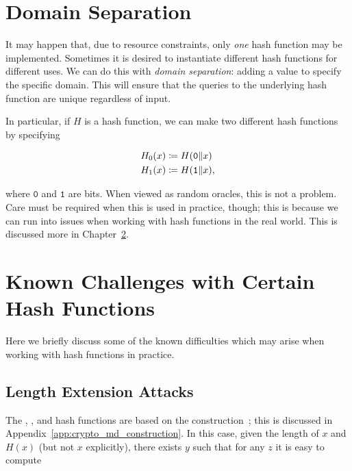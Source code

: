 \section{Domain Separation}

It may happen that, due to resource constraints, only \emph{one}
\gls{hash function} may be implemented.
Sometimes it is desired to instantiate different \glspl{hash function}
for different uses.
We can do this with \emph{domain separation}:
adding a value to specify the specific domain.
This will ensure that the queries to the underlying \gls{hash function}
are unique regardless of input.

In particular, if $H$ is a \gls{hash function}, we can make two different
\glspl{hash function} by specifying

\begin{align}
    H_{0}(x) &\coloneqq{} H(\texttt{0}\|x) \nonumber\\
    H_{1}(x) &\coloneqq{} H(\texttt{1}\|x),
\end{align}

\noindent
where $\texttt{0}$ and $\texttt{1}$ are bits.
When viewed as \glspl{random oracle}, this is not a problem.
Care must be required when this is used in practice, though;
this is because we can run into issues when working with
\glspl{hash function} in the real world.
This is discussed more in Chapter~\ref{sec:hash_challenges}.



\section{Known Challenges with Certain Hash Functions}
\label{sec:hash_challenges}

Here we briefly discuss some of the known difficulties which may arise when
working with \glspl{hash function} in practice.

\subsection{Length Extension Attacks}
\label{ssec:hash_challenges_length_extension}

The \MDFive{}, \ShaOne{}, and \ShaTwo{} \glspl{hash function} are based
on the \MD{}
construction~\cite{merkle1979secrecy,damgaard1989design};
this is discussed in Appendix~\ref{app:crypto_md_construction}.
In this case, given the length of $x$ and $H(x)$ (but not $x$ explicitly),
there exists $y$ such that for any $z$
it is easy to compute

